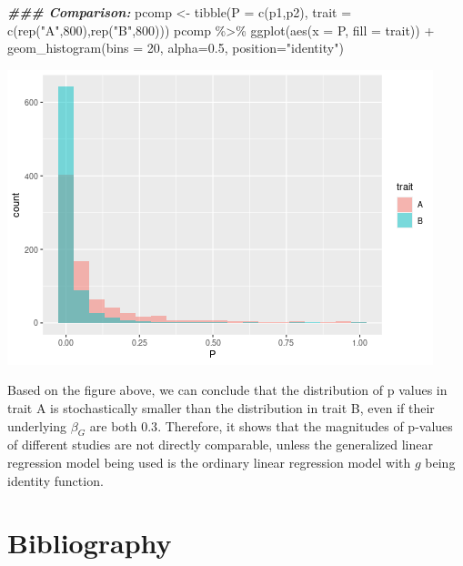 \documentclass[
]{article}
\newenvironment{Shaded}{\begin{snugshade}}{\end{snugshade}}
\newcommand{\AttributeTok}[1]{\textcolor[rgb]{0.77,0.63,0.00}{#1}}
\newcommand{\DecValTok}[1]{\textcolor[rgb]{0.00,0.00,0.81}{#1}}
\newcommand{\DocumentationTok}[1]{\textcolor[rgb]{0.56,0.35,0.01}{\textbf{\textit{#1}}}}
\newcommand{\FloatTok}[1]{\textcolor[rgb]{0.00,0.00,0.81}{#1}}
\newcommand{\FunctionTok}[1]{\textcolor[rgb]{0.00,0.00,0.00}{#1}}
\newcommand{\NormalTok}[1]{#1}
\newcommand{\OtherTok}[1]{\textcolor[rgb]{0.56,0.35,0.01}{#1}}
\newcommand{\SpecialCharTok}[1]{\textcolor[rgb]{0.00,0.00,0.00}{#1}}
\newcommand{\StringTok}[1]{\textcolor[rgb]{0.31,0.60,0.02}{#1}}
\begin{document}
\begin{Shaded}
\begin{Highlighting}[]
\DocumentationTok{\#\#\# Comparison:}
\NormalTok{pcomp }\OtherTok{\textless{}{-}} \FunctionTok{tibble}\NormalTok{(}\AttributeTok{P =} \FunctionTok{c}\NormalTok{(p1,p2), }\AttributeTok{trait =} \FunctionTok{c}\NormalTok{(}\FunctionTok{rep}\NormalTok{(}\StringTok{"A"}\NormalTok{,}\DecValTok{800}\NormalTok{),}\FunctionTok{rep}\NormalTok{(}\StringTok{"B"}\NormalTok{,}\DecValTok{800}\NormalTok{)))}
\NormalTok{pcomp }\SpecialCharTok{\%\textgreater{}\%} \FunctionTok{ggplot}\NormalTok{(}\FunctionTok{aes}\NormalTok{(}\AttributeTok{x =}\NormalTok{ P, }\AttributeTok{fill =}\NormalTok{ trait)) }\SpecialCharTok{+} \FunctionTok{geom\_histogram}\NormalTok{(}\AttributeTok{bins =} \DecValTok{20}\NormalTok{, }\AttributeTok{alpha=}\FloatTok{0.5}\NormalTok{, }\AttributeTok{position=}\StringTok{"identity"}\NormalTok{)}
\end{Highlighting}
\end{Shaded}

\includegraphics{GWAS-Pvalues_files/figure-latex/visualization-1.png}

Based on the figure above, we can conclude that the distribution of p
values in trait A is stochastically smaller than the distribution in
trait B, even if their underlying \(\beta_G\) are both \(0.3\).
Therefore, it shows that the magnitudes of p-values of different studies
are not directly comparable, unless the generalized linear regression
model being used is the ordinary linear regression model with \(g\)
being identity function.

\clearpage

\hypertarget{bibliography}{%
\section{Bibliography}\label{bibliography}}
\end{document}

